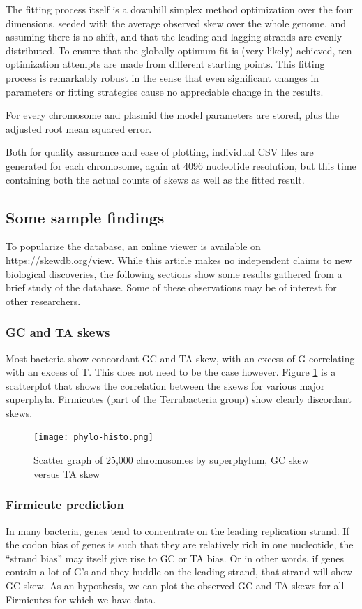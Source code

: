 \documentclass[fleqn,10pt]{wlscirep}
\begin{document}
The fitting process itself is a downhill simplex method optimization\cite{Nelder1965} over the four dimensions, seeded with the average observed skew over the whole genome, and assuming there is no shift, and that the leading and lagging strands are evenly distributed. To ensure that the globally optimum fit is (very likely) achieved, ten optimization attempts are made from different starting points. This fitting process is remarkably robust in the sense that even significant changes in parameters or fitting strategies cause no appreciable change in the results. 

For every chromosome and plasmid the model parameters are stored, plus the adjusted root mean squared error.

Both for quality assurance and ease of plotting, individual CSV files are generated for each chromosome, again at 4096 nucleotide resolution, but this time containing both the actual counts of skews as well as the fitted result.
  
\subsection*{Some sample findings}
To popularize the database, an online viewer is available on \url{https://skewdb.org/view}. While this article makes no independent claims to new biological discoveries, the following sections show some results gathered from a brief study of the database. Some of these observations may be of interest for other researchers.
\subsubsection*{GC and TA skews}
Most bacteria show concordant GC and TA skew, with an excess of G correlating with an excess of T. This does not need to be the case however. Figure \ref{fig:gc-ta-scatter} is a scatterplot that shows the correlation between the skews for various major superphyla. Firmicutes (part of the Terrabacteria group) show clearly discordant skews.

\begin{figure}[ht]
\centering
\texttt{[image: phylo-histo.png]}
\caption{Scatter graph of 25,000 chromosomes by superphylum, GC skew versus TA skew}
\label{fig:gc-ta-scatter}
\end{figure}


\subsubsection*{Firmicute prediction}
In many bacteria, genes tend to concentrate on the leading replication strand. If the codon bias of genes is such that they are relatively rich in one nucleotide, the ``strand bias'' may itself give rise to GC or TA bias. Or in other words, if genes contain a lot of G's and they huddle on the leading strand, that strand will show GC skew. As an hypothesis, we can plot the observed GC and TA skews for all Firmicutes for which we have data.
\end{document}

